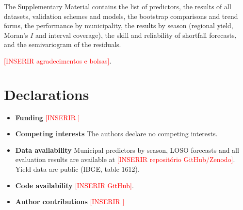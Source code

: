 \documentclass[pdflatex,sn-basic]{sn-jnl}
\newcommand{\inserir}[1]{\textcolor{red}{[INSERIR #1]}}
\begin{document}
\backmatter

The Supplementary Material contains the list of predictors, the results of all datasets, validation schemes and models, the bootstrap comparisons and trend forms, the performance by municipality, the results by season (regional yield, Moran's $I$ and interval coverage), the skill and reliability of shortfall forecasts, and the semivariogram of the residuals.

\inserir{agradecimentos e bolsas}.

\section*{Declarations}
\begin{itemize}
\item \textbf{Funding} \inserir{}
\item \textbf{Competing interests} The authors declare no competing interests.
\item \textbf{Data availability} Municipal predictors by season, LOSO forecasts and all evaluation results are available at \inserir{repositório GitHub/Zenodo}. Yield data are public (IBGE, table 1612).
\item \textbf{Code availability} \inserir{GitHub}.
\item \textbf{Author contributions} \inserir{}
\end{itemize}


\end{document}
